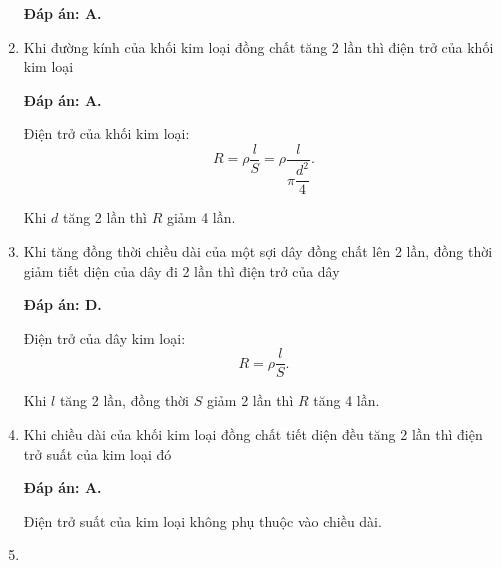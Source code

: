 \begin{enumerate}[label=\bfseries Câu \arabic*:]
{	}
	\loigiai
	{	\textbf{Đáp án: A.}
		
	}
	\item {}
	
	\cauhoi
	{Khi đường kính của khối kim loại đồng chất tăng 2 lần thì điện trở của khối kim loại
		
	}
	\loigiai
	{	\textbf{Đáp án: A.}
		
		Điện trở của khối kim loại:
		$$R= \rho \dfrac{l}{S} = \rho \dfrac{l}{\pi \dfrac{d^2}{4}}.$$
		
		Khi $d$ tăng 2 lần thì $R$ giảm 4 lần.
	}
	\item {}
	
	\cauhoi
	{Khi tăng đồng thời chiều dài của một sợi dây đồng chất lên 2 lần, đồng thời giảm tiết diện của dây đi 2 lần thì điện trở của dây
		
	}
	\loigiai
	{	\textbf{Đáp án: D.}
		
		Điện trở của dây kim loại:
		$$R=\rho \dfrac{l}{S}.$$
		
		Khi $l$ tăng 2 lần, đồng thời $S$ giảm 2 lần thì $R$ tăng 4 lần.
	}
	\item {}
	
	\cauhoi
	{Khi chiều dài của khối kim loại đồng chất tiết diện đều tăng 2 lần thì điện trở suất của kim loại đó
		
	}
	\loigiai
	{	\textbf{Đáp án: A.}
		
		Điện trở suất của kim loại không phụ thuộc vào chiều dài.
	}
	\item {}
	

\end{enumerate}
